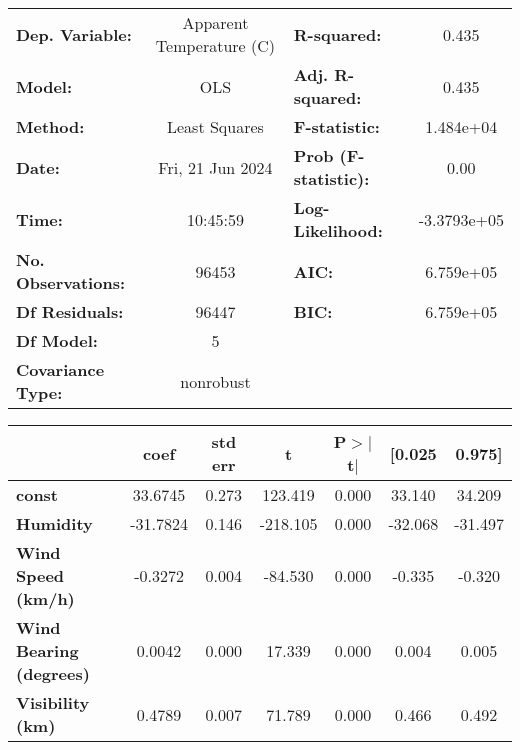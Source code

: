\begin{center}
\begin{tabular}{lclc}
\toprule
\textbf{Dep. Variable:}         & Apparent Temperature (C) & \textbf{  R-squared:         } &      0.435   \\
\textbf{Model:}                 &           OLS            & \textbf{  Adj. R-squared:    } &      0.435   \\
\textbf{Method:}                &      Least Squares       & \textbf{  F-statistic:       } &  1.484e+04   \\
\textbf{Date:}                  &     Fri, 21 Jun 2024     & \textbf{  Prob (F-statistic):} &      0.00    \\
\textbf{Time:}                  &         10:45:59         & \textbf{  Log-Likelihood:    } & -3.3793e+05  \\
\textbf{No. Observations:}      &           96453          & \textbf{  AIC:               } &  6.759e+05   \\
\textbf{Df Residuals:}          &           96447          & \textbf{  BIC:               } &  6.759e+05   \\
\textbf{Df Model:}              &               5          & \textbf{                     } &              \\
\textbf{Covariance Type:}       &        nonrobust         & \textbf{                     } &              \\
\bottomrule
\end{tabular}
\begin{tabular}{lcccccc}
                                & \textbf{coef} & \textbf{std err} & \textbf{t} & \textbf{P$> |$t$|$} & \textbf{[0.025} & \textbf{0.975]}  \\
\midrule
\textbf{const}                  &      33.6745  &        0.273     &   123.419  &         0.000        &       33.140    &       34.209     \\
\textbf{Humidity}               &     -31.7824  &        0.146     &  -218.105  &         0.000        &      -32.068    &      -31.497     \\
\textbf{Wind Speed (km/h)}      &      -0.3272  &        0.004     &   -84.530  &         0.000        &       -0.335    &       -0.320     \\
\textbf{Wind Bearing (degrees)} &       0.0042  &        0.000     &    17.339  &         0.000        &        0.004    &        0.005     \\
\textbf{Visibility (km)}        &       0.4789  &        0.007     &    71.789  &         0.000        &        0.466    &        0.492     \\

\end{tabular}
\end{center}
